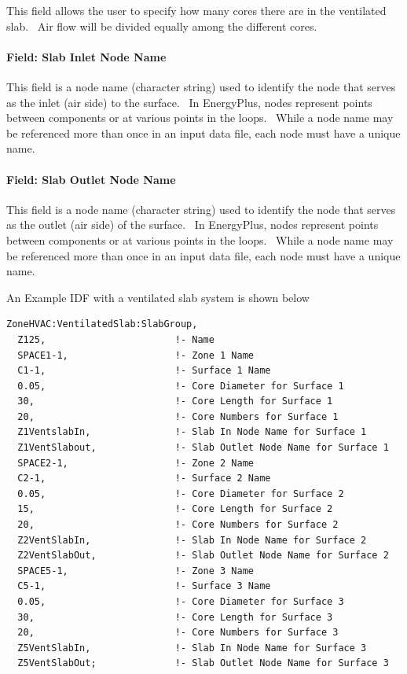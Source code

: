 This field allows the user to specify how many cores there are in the ventilated slab.~ Air flow will be divided equally among the different cores.

\paragraph{Field: Slab Inlet Node Name}\label{field-slab-inlet-node-name}

This field is a node name (character string) used to identify the node that serves as the inlet (air side) to the surface.~ In EnergyPlus, nodes represent points between components or at various points in the loops.~ While a node name may be referenced more than once in an input data file, each node must have a unique name.

\paragraph{Field: Slab Outlet Node Name}\label{field-slab-outlet-node-name}

This field is a node name (character string) used to identify the node that serves as the outlet (air side) of the surface.~ In EnergyPlus, nodes represent points between components or at various points in the loops.~ While a node name may be referenced more than once in an input data file, each node must have a unique name.

An Example IDF with a ventilated slab system is shown below

\begin{lstlisting}
ZoneHVAC:VentilatedSlab:SlabGroup,
  Z125,                       !- Name
  SPACE1-1,                   !- Zone 1 Name
  C1-1,                       !- Surface 1 Name
  0.05,                       !- Core Diameter for Surface 1
  30,                         !- Core Length for Surface 1
  20,                         !- Core Numbers for Surface 1
  Z1VentslabIn,               !- Slab In Node Name for Surface 1
  Z1VentSlabout,              !- Slab Outlet Node Name for Surface 1
  SPACE2-1,                   !- Zone 2 Name
  C2-1,                       !- Surface 2 Name
  0.05,                       !- Core Diameter for Surface 2
  15,                         !- Core Length for Surface 2
  20,                         !- Core Numbers for Surface 2
  Z2VentSlabIn,               !- Slab In Node Name for Surface 2
  Z2VentSlabOut,              !- Slab Outlet Node Name for Surface 2
  SPACE5-1,                   !- Zone 3 Name
  C5-1,                       !- Surface 3 Name
  0.05,                       !- Core Diameter for Surface 3
  30,                         !- Core Length for Surface 3
  20,                         !- Core Numbers for Surface 3
  Z5VentSlabIn,               !- Slab In Node Name for Surface 3
  Z5VentSlabOut;              !- Slab Outlet Node Name for Surface 3
\end{lstlisting}
